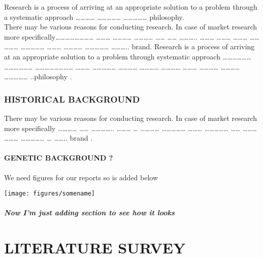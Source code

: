 \documentclass[12pt,a4paper]{report}
\begin{document}
Research is a process of arriving at an appropriate solution to a problem through a systematic approach ………… …………… …………… 
philosophy. 
\\ %

There may be various reasons for conducting research. In case of market research more specifically…………………… ……… ………… ………… …… ……
……….. ……… ……… ……… …… ……… …………… ……… ………… ……………
……….. brand. Research is a process of arriving at an appropriate solution to a problem \cite{Dirac}
through systematic approach ……………… ……………… ……………………
……… …………… ………… ………… ………… ………
………… ………… ……………   ..philosophy \citep{mkgandhi}.
\subsection{HISTORICAL BACKGROUND}
 There may be various reasons for conducting research\cite{duncombe}. In case of market
research more specifically  \cite{bradshaw} …………
…… ………….. ……… … ………… …………… ………
…………… …… ……… ……… …………… … …….. brand \cite{andrews}.

\subsubsection{GENETIC BACKGROUND ?}
\lipsum[2-4]We need figures for our reports so  is added below\\ 

\begin{center}
    \texttt{[image: figures/somename]}
    \label{fig:somelabel}
\end{center}

\paragraph{Now I'm just adding section to see how it looks}

\lipsum[1]


\chapter{LITERATURE SURVEY}

\lipsum[3-8] \\

\lipsum
\end{document}
